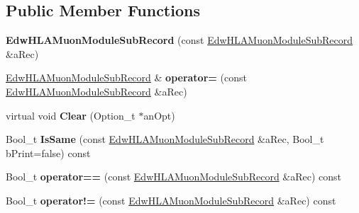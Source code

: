 \subsection*{Public Member Functions}
\begin{DoxyCompactItemize}
\item 
\hypertarget{class_edw_h_l_a_muon_module_sub_record_ab7a894f96a59df0f755824fdce735537}{
{\bfseries EdwHLAMuonModuleSubRecord} (const \hyperlink{class_edw_h_l_a_muon_module_sub_record}{EdwHLAMuonModuleSubRecord} \&aRec)}
\label{class_edw_h_l_a_muon_module_sub_record_ab7a894f96a59df0f755824fdce735537}

\item 
\hypertarget{class_edw_h_l_a_muon_module_sub_record_a92cf758227b32379c31a09320a72a300}{
\hyperlink{class_edw_h_l_a_muon_module_sub_record}{EdwHLAMuonModuleSubRecord} \& {\bfseries operator=} (const \hyperlink{class_edw_h_l_a_muon_module_sub_record}{EdwHLAMuonModuleSubRecord} \&aRec)}
\label{class_edw_h_l_a_muon_module_sub_record_a92cf758227b32379c31a09320a72a300}

\item 
\hypertarget{class_edw_h_l_a_muon_module_sub_record_a7140e7644d79d7c37c434d6a1687a2a2}{
virtual void {\bfseries Clear} (Option\_\-t $\ast$anOpt)}
\label{class_edw_h_l_a_muon_module_sub_record_a7140e7644d79d7c37c434d6a1687a2a2}

\item 
\hypertarget{class_edw_h_l_a_muon_module_sub_record_a8358244a0bc7344ce0cc825bf776bda3}{
Bool\_\-t {\bfseries IsSame} (const \hyperlink{class_edw_h_l_a_muon_module_sub_record}{EdwHLAMuonModuleSubRecord} \&aRec, Bool\_\-t bPrint=false) const }
\label{class_edw_h_l_a_muon_module_sub_record_a8358244a0bc7344ce0cc825bf776bda3}

\item 
\hypertarget{class_edw_h_l_a_muon_module_sub_record_a43525483e4b5603c51f10521e57dabb1}{
Bool\_\-t {\bfseries operator==} (const \hyperlink{class_edw_h_l_a_muon_module_sub_record}{EdwHLAMuonModuleSubRecord} \&aRec) const }
\label{class_edw_h_l_a_muon_module_sub_record_a43525483e4b5603c51f10521e57dabb1}

\item 
\hypertarget{class_edw_h_l_a_muon_module_sub_record_a02b6565dbaeb4c9e062c500337d8aff0}{
Bool\_\-t {\bfseries operator!=} (const \hyperlink{class_edw_h_l_a_muon_module_sub_record}{EdwHLAMuonModuleSubRecord} \&aRec) const }
\label{class_edw_h_l_a_muon_module_sub_record_a02b6565dbaeb4c9e062c500337d8aff0}


\end{DoxyCompactItemize}
